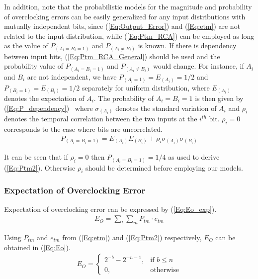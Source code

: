 \documentclass[prodmode,acmtrets]{acmsmall} %
\begin{document}
In addition, note that the probabilistic models for the magnitude and probability of overclocking errors can be easily generalized for any input distributions with mutually independent bits, since (\ref{Eq:Output_Error}) and (\ref{Eq:etm}) are not related to the input distribution, while (\ref{Eq:Ptm_RCA}) can be employed as long as the value of $P_{(A_i=B_i=1)}$ and $P_{(A_i\neq B_i)}$ is known. If there is dependency between input bits, (\ref{Eq:Ptm_RCA_General}) should be used and the probability value of $P_{(A_i=B_i=1)}$ and $P_{(A_i\neq B_i)}$ would change. For instance, if $A_i$ and $B_i$ are not independent, we have $P_{(A_i=1)}=E_{(A_i)}=1/2$ and $P_{(B_i=1)}=E_{(B_i)}=1/2$ separately for uniform distribution, where $E_{(A_i)}$ denotes the expectation of $A_i$. The probability of $A_i=B_i=1$ is then given by (\ref{Eq:P_dependency})~\cite{TransitionProb} where $\sigma_{(A_i)}$ denotes the standard variation of $A_i$ and $\rho_i$ denotes the temporal correlation between the two inputs at the $i^{th}$ bit. $\rho_i=0$ corresponds to the case where bits are uncorrelated.
%
\begin{eqnarray}\label{Eq:P_dependency}
    P_{(A_i=B_i=1)}=E_{(A_i)}E_{(B_i)}+\rho_i\sigma_{(A_i)}\sigma_{(B_i)}
\end{eqnarray}

It can be seen that if $\rho_i=0$ then $P_{(A_i=B_i=1)}=1/4$ as used to derive (\ref{Eq:Ptm2}). Otherwise $\rho_i$ should be determined before employing our models.

\subsubsection{Expectation of Overclocking Error}
Expectation of overclocking error can be expressed by (\ref{Eq:Eo_exp}).
%
\begin{eqnarray}\label{Eq:Eo_exp}
    E_O=\sum_{t}\sum_{m}P_{tm}\cdot e_{tm}
\end{eqnarray}

Using $P_{tm}$ and $e_{tm}$ from (\ref{Eq:etm}) and (\ref{Eq:Ptm2}) respectively, $E_O$ can be obtained in (\ref{Eq:Eo}).
%
\begin{eqnarray}\label{Eq:Eo}
      E_O=\left\{
        \begin{matrix}
            2^{-b}-2^{-n-1}, & \textrm{if $b\leq n$}\\
            0, & \textrm{otherwise}
        \end{matrix}
      \right.
\end{eqnarray}
\end{document}
